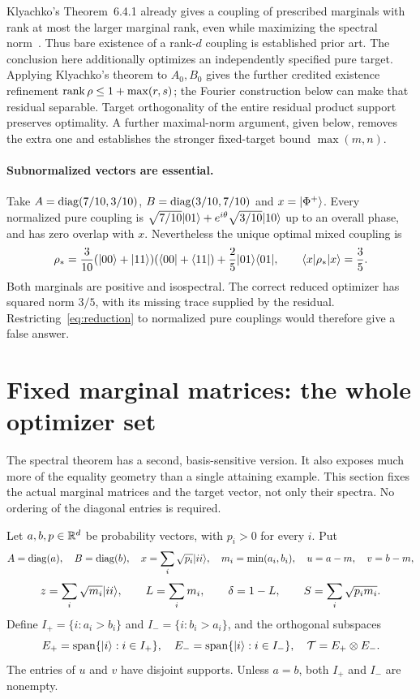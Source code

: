 Klyachko's Theorem~6.4.1 already gives a coupling of prescribed marginals with rank at most the larger marginal rank, even while maximizing the spectral norm~\cite{klyachko}. Thus bare existence of a rank-$d$ coupling is established prior art. The conclusion here additionally optimizes an independently specified pure target. Applying Klyachko's theorem to $A_0,B_0$ gives the further credited existence refinement $\operatorname{rank}\rho\le1+\max(r,s)$; the Fourier construction below can make that residual separable. Target orthogonality of the entire residual product support preserves optimality. A further maximal-norm argument, given below, removes the extra one and establishes the stronger fixed-target bound $\max(m,n)$.

\paragraph{Subnormalized vectors are essential.}
Take $A=\operatorname{diag}(7/10,3/10)$, $B=\operatorname{diag}(3/10,7/10)$ and $x=\lvert \Phi^+\rangle$. Every normalized pure coupling is
$\sqrt{7/10}\lvert 01\rangle+e^{i\theta}\sqrt{3/10}\lvert 10\rangle$ up to an overall phase, and has zero overlap with $x$. Nevertheless the unique optimal mixed coupling is
\[
 \rho_* =\frac3{10}(\lvert 00\rangle+\lvert 11\rangle)(\langle 00\rvert+\langle 11\rvert)
            +\frac25\lvert 01\rangle\langle 01\rvert,
 \qquad \langle x\rvert\rho_*\lvert x\rangle=\frac35.
\]
Both marginals are positive and isospectral. The correct reduced optimizer has squared norm $3/5$, with its missing trace supplied by the residual. Restricting~\eqref{eq:reduction} to normalized pure couplings would therefore give a false answer.






\section{Fixed marginal matrices: the whole optimizer set}\label{sec:face}
The spectral theorem has a second, basis-sensitive version. It also exposes much more of the equality geometry than a single attaining example. This section fixes the actual marginal matrices and the target vector, not only their spectra. No ordering of the diagonal entries is required.

Let $a,b,p\in\mathbb R^d$ be probability vectors, with $p_i>0$ for every $i$. Put
\[
 A=\operatorname{diag}(a),\quad B=\operatorname{diag}(b),\quad
 x=\sum_i\sqrt{p_i}\lvert ii\rangle,\quad
 m_i=\min(a_i,b_i),\quad u=a-m,\quad v=b-m,
\]
\[
 z=\sum_i\sqrt{m_i}\lvert ii\rangle,\qquad
 L=\sum_i m_i,\qquad \delta=1-L,\qquad
 S=\sum_i\sqrt{p_i m_i}.
\]
Define $I_+=\{i:a_i>b_i\}$ and $I_-=\{i:b_i>a_i\}$, and the orthogonal subspaces
\[
 E_+=\operatorname{span}\{\lvert i\rangle:i\in I_+\},\quad
 E_-=\operatorname{span}\{\lvert i\rangle:i\in I_-\},\quad
 \mathcal T=E_+\otimes E_-.
\]
The entries of $u$ and $v$ have disjoint supports. Unless $a=b$, both $I_+$ and $I_-$ are nonempty.


